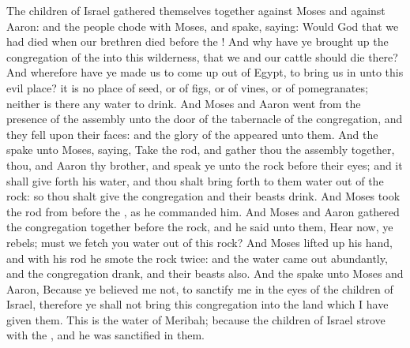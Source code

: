  The children of Israel gathered themselves together against Moses and against Aaron: and the people chode with Moses, and spake, saying: Would God that we had died when our brethren died before the ! And why have ye brought up the congregation of the  into this wilderness, that we and our cattle should die there? And wherefore have ye made us to come up out of Egypt, to bring us in unto this evil place? it is no place of seed, or of figs, or of vines, or of pomegranates; neither is there any water to drink. And Moses and Aaron went from the presence of the assembly unto the door of the tabernacle of the congregation, and they fell upon their faces: and the glory of the  appeared unto them. And the  spake unto Moses, saying, Take the rod, and gather thou the assembly together, thou, and Aaron thy brother, and speak ye unto the rock before their eyes; and it shall give forth his water, and thou shalt bring forth to them water out of the rock: so thou shalt give the congregation and their beasts drink. And Moses took the rod from before the , as he commanded him. And Moses and Aaron gathered the congregation together before the rock, and he said unto them, Hear now, ye rebels; must we fetch you water out of this rock? And Moses lifted up his hand, and with his rod he smote the rock twice: and the water came out abundantly, and the congregation drank, and their beasts also. And the  spake unto Moses and Aaron, Because ye believed me not, to sanctify me in the eyes of the children of Israel, therefore ye shall not bring this congregation into the land which I have given them. This is the water of Meribah; because the children of Israel strove with the , and he was sanctified in them.


